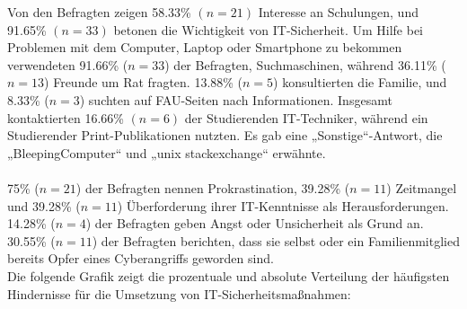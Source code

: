 \documentclass[german,report]{i1thesis}
\begin{document}
Von den Befragten zeigen 58.33\% \((n = 21)\) Interesse an Schulungen, und 91.65\% \((n = 33)\) betonen die Wichtigkeit von IT-Sicherheit. Um Hilfe bei Problemen mit dem Computer, Laptop oder Smartphone zu bekommen verwendeten 91.66\% (\(n = 33\)) der Befragten, Suchmaschinen, während 36.11\% (\(n = 13\)) Freunde um Rat fragten. 13.88\% (\(n = 5\)) konsultierten die Familie, und 8.33\% (\(n = 3\)) suchten auf FAU-Seiten nach Informationen. Insgesamt kontaktierten 16.66\% \((n = 6)\) der Studierenden IT-Techniker, während ein Studierender Print-Publikationen nutzten. Es gab eine „Sonstige“-Antwort, die „BleepingComputer“ und „unix stackexchange“ erwähnte.\\
\\
75\% (\(n = 21\)) der Befragten nennen Prokrastination, 39.28\% (\(n = 11\)) Zeitmangel und 39.28\% (\(n = 11\)) Überforderung ihrer IT-Kenntnisse als Herausforderungen. 14.28\% (\(n = 4\)) der Befragten geben Angst oder Unsicherheit als Grund an. 30.55\% (\(n = 11\)) der Befragten berichten, dass sie selbst oder ein Familienmitglied bereits Opfer eines Cyberangriffs geworden sind.
\\
Die folgende Grafik zeigt die prozentuale und absolute Verteilung der häufigsten Hindernisse für die Umsetzung von IT-Sicherheitsmaßnahmen:
\end{document}
